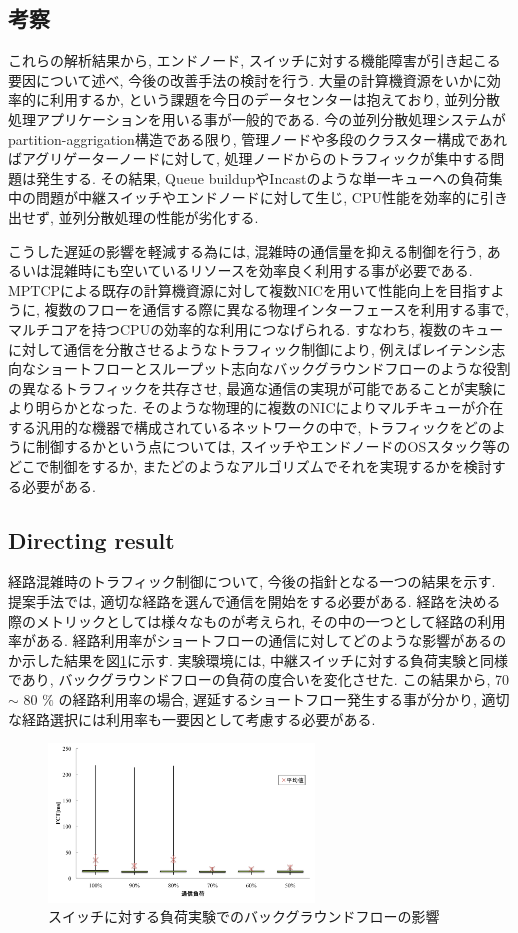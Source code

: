 \subsection{考察}
\label{sec:analysis}
これらの解析結果から, エンドノード, スイッチに対する機能障害が引き起こる要因について述べ, 今後の改善手法の検討を行う.
大量の計算機資源をいかに効率的に利用するか, という課題を今日のデータセンターは抱えており,
並列分散処理アプリケーションを用いる事が一般的である.
今の並列分散処理システムがpartition-aggrigation構造である限り, 管理ノードや多段のクラスター構成であればアグリゲーターノードに対して,
処理ノードからのトラフィックが集中する問題は発生する.
その結果, Queue buildupやIncastのような単一キューへの負荷集中の問題が中継スイッチやエンドノードに対して生じ,
CPU性能を効率的に引き出せず, 並列分散処理の性能が劣化する.

こうした遅延の影響を軽減する為には, 混雑時の通信量を抑える制御を行う, あるいは混雑時にも空いているリソースを効率良く利用する事が必要である.
MPTCPによる既存の計算機資源に対して複数NICを用いて性能向上を目指すように,
複数のフローを通信する際に異なる物理インターフェースを利用する事で, マルチコアを持つCPUの効率的な利用につなげられる.
すなわち, 複数のキューに対して通信を分散させるようなトラフィック制御により,
例えばレイテンシ志向なショートフローとスループット志向なバックグラウンドフローのような役割の異なるトラフィックを共存させ,
最適な通信の実現が可能であることが実験により明らかとなった.
そのような物理的に複数のNICによりマルチキューが介在する汎用的な機器で構成されているネットワークの中で,
トラフィックをどのように制御するかという点については, スイッチやエンドノードのOSスタック等のどこで制御をするか, またどのようなアルゴリズムでそれを実現するかを検討する必要がある.

\subsection{Directing result}
\label{sec:analysis}
経路混雑時のトラフィック制御について, 今後の指針となる一つの結果を示す.
提案手法では, 適切な経路を選んで通信を開始をする必要がある.
経路を決める際のメトリックとしては様々なものが考えられ, その中の一つとして経路の利用率がある.
経路利用率がショートフローの通信に対してどのような影響があるのか示した結果を図\ref{fig:load_test}に示す.
実験環境には, 中継スイッチに対する負荷実験と同様であり, バックグラウンドフローの負荷の度合いを変化させた.
この結果から, 70 $\sim$ 80 $ \% $ の経路利用率の場合, 遅延するショートフロー発生する事が分かり,
適切な経路選択には利用率も一要因として考慮する必要がある.

\begin{figure}[t]
    \begin{center}
    \includegraphics[autoebb, width=200pt]{./img/load_test.pdf}
    \caption{スイッチに対する負荷実験でのバックグラウンドフローの影響}
    \label{fig:load_test}
    \end{center}
\end{figure}
